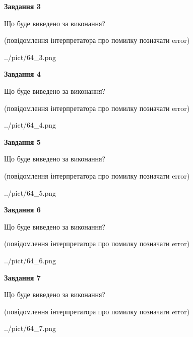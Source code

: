 \documentclass[12pt, ukrainian]{article}
\begin{document}
{\begin {large}
{\begin {center}\textbf{Завдання 3}\end {center}}\par
Що буде виведено за виконання?\par
 (повідомлення інтерпретатора про помилку позначати error)\par
\begin{center}
	{../pict/64_3.png}
\end{center}
\newpage

{\begin {center}\textbf{Завдання 4}\end {center}}\par
Що буде виведено за виконання?\par
 (повідомлення інтерпретатора про помилку позначати error)\par
\begin{center}
	{../pict/64_4.png}
\end{center}
\newpage

{\begin {center}\textbf{Завдання 5}\end {center}}\par
Що буде виведено за виконання?\par
 (повідомлення інтерпретатора про помилку позначати error)\par
\begin{center}
	{../pict/64_5.png}
\end{center}
\newpage

{\begin {center}\textbf{Завдання 6}\end {center}}\par
Що буде виведено за виконання?\par
 (повідомлення інтерпретатора про помилку позначати error)\par
\begin{center}
	{../pict/64_6.png}
\end{center}
\newpage

{\begin {center}\textbf{Завдання 7}\end {center}}\par
Що буде виведено за виконання?\par
 (повідомлення інтерпретатора про помилку позначати error)\par
\begin{center}
	{../pict/64_7.png}
\end{center}
\newpage


\end{large}}
\end{document}
